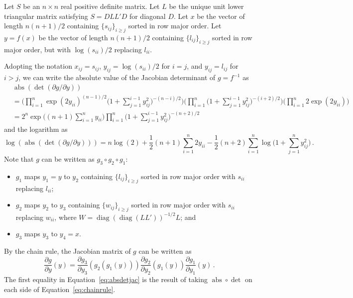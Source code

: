 \documentclass[12pt]{article}
\DeclareMathOperator{\abs}{abs}
\DeclareMathOperator{\diag}{diag}
\begin{document}
\setlength{\parskip}{5mm}
\setlength{\parindent}{0mm}

Let $S$ be an $n \times n$ real positive definite matrix.  Let $L$ be
the unique unit lower triangular matrix satisfying $S = D L L' D$ for
diagonal $D$.  Let $x$ be the vector of length $n (n + 1)/2$ containing
$\{s_{ij}\}_{i \geq j}$ sorted in row major order.  Let $y = f(x)$ be
the vector of length $n (n + 1)/2$ containing $\{l_{ij}\}_{i \geq j}$
sorted in row major order, but with $\log(s_{ii})/2$ replacing $l_{ii}$.

Adopting the notation
$x_{ij} = s_{ij}$,
$y_{ij} = \log(s_{ii}) / 2$ for $i = j$, and
$y_{ij} = l_{ij}$ for $i > j$,
we can write the absolute value of the Jacobian determinant of
$g = f^{-1}$ as
\begin{equation}
\label{eq:absdetjac}
\begin{aligned}
&\abs(\det(\partial g/\partial y)) \\
&= \Big( \prod_{i=1}^{n} \exp(2 y_{ii})^{(n-1)/2} \Big( 1 + \sum_{j=1}^{i-1} y_{ij}^{2} \Big)^{-(n-i)/2} \Big) \Big( \prod_{i=1}^{n} \Big( 1 + \sum_{j=1}^{i-1} y_{ij}^{2} \Big)^{-(i+2)/2} \Big) \Big( \prod_{i=1}^{n} 2 \exp(2 y_{ii}) \Big) \\
&= 2^{n} \exp\Big((n + 1) \sum_{i=1}^{n} y_{ii}\Big) \prod_{i=1}^{n} \Big( 1 + \sum_{j=1}^{i-1} y_{ij}^{2} \Big)^{-(n+2)/2}
\end{aligned}
\end{equation}
and the logarithm as
\begin{equation}
\log(\abs(\det(\partial g/\partial y))) = n \log(2) + \frac{1}{2} (n + 1) \sum_{i=1}^{n} 2 y_{ii} - \frac{1}{2} (n + 2) \sum_{i=1}^{n} \log\Big( 1 + \sum_{j=1}^{n} y_{ij}^{2}\Big)\,.
\end{equation}
Note that $g$ can be written as $g_{3} \circ g_{2} \circ g_{1}$:
\begin{itemize}
\item
$g_{1}$ maps $y_{1} = y$ to $y_{2}$ containing
$\{l_{ij}\}_{i \geq j}$ sorted in row major order with $s_{ii}$
replacing $l_{ii}$;
\item
$g_{2}$ maps $y_{2}$     to $y_{3}$ containing
$\{w_{ij}\}_{i \geq j}$ sorted in row major order with $s_{ii}$
replacing $w_{ii}$, where $W = \diag(\diag(L L'))^{-1/2} L$; and
\item
$g_{3}$ maps $y_{3}$     to $y_{4} = x$.
\end{itemize}
By the chain rule, the Jacobian matrix of $g$ can be written as
\begin{equation}
\label{eq:chainrule}
\frac{\partial g}{\partial y}(y) =
\frac{\partial g_{3}}{\partial y_{3}}(g_{2}(g_{1}(y)))
\frac{\partial g_{2}}{\partial y_{2}}(      g_{1}(y) )
\frac{\partial g_{1}}{\partial y_{1}}(            y  )\,.
\end{equation}
The first equality in Equation~\ref{eq:absdetjac} is the result of
taking $\abs \circ \det$ on each side of Equation~\ref{eq:chainrule}.
\end{document}
